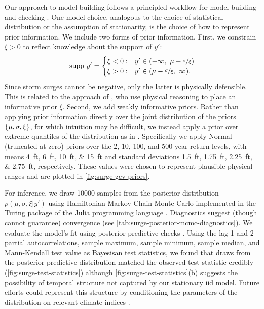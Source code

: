 \documentclass[11pt]{article}
\begin{document}
Our approach to model building follows a principled workflow for model building and checking \citep[see][for details]{gelman_workflow:2020}.
One model choice, analogous to the choice of statistical distribution or the assumption of stationarity, is the choice of how to represent prior information.
We include two forms of prior information.
First, we constrain $\xi > 0$ to reflect knowledge about the support of $y'$:
\begin{equation*}
    \mathrm{supp}~ y' =
    \begin{cases}
        \xi < 0: & y' \in \qty(-\infty,~ \mu - \nicefrac{\sigma}{\xi}) \\
        \xi > 0: & y' \in \qty(\mu-\nicefrac{\sigma}{\xi},~ \infty).
    \end{cases}
\end{equation*}
Since storm surges cannot be negative, only the latter is physically defensible.
This is related to the approach of \citet{martins_estimators:2000}, who use physical reasoning to place an informative prior $\xi$.
Second, we add weakly informative priors.
Rather than applying prior information directly over the joint distribution of the priors $\qty{\mu,\sigma,\xi}$, for which intuition may be difficult, we instead apply a prior over extreme quantiles of the distribution as in \citet{coles_evd:1996}.
Specifically we apply Normal (truncated at zero) priors over the 2, 10, 100, and 500 year return levels, with means \SIlist{4;6;10;15}{ft} and standard deviations \SIlist{1.5;1.75;2.25;2.75}{ft}, respectively.
These values were chosen to represent plausible physical ranges and are plotted in \cref{fig:surge-gev-priors}.

For inference, we draw \num{10000} samples from the posterior distribution $p(\mu,\sigma,\xi | y')$ using Hamiltonian Markov Chain Monte Carlo \citep{Betancourt:2017vd,hoffman_nuts:2011} implemented in the Turing package of the Julia programming language \citep{perkel_julia:2019,ge_turing:2018,tarek_dynamicppl:2020,besancon_distributions.jl:2021,bezanson_julia:2012}.
Diagnostics suggest (though cannot guarantee) convergence (see \cref{tab:surge-posterior-mcmc-diagnostics}).
We evaluate the model's fit using posterior predictive checks \citep[section 2.4 and references therein]{gelman_workflow:2020}.
Using the lag 1 and 2 partial autocorrelations, sample maximum, sample minimum, sample median, and Mann-Kendall test value as Bayesisan test statistics, we found that draws from the posterior predictive distribution matched the observed test statistic credibly (\cref{fig:surge-test-statistics}) although \cref{fig:surge-test-statistics}(b) suggests the possibility of temporal structure not captured by our stationary \gls{iid} model.
Future efforts could represent this structure by conditioning the parameters of the distribution on relevant climate indices \citep[as in][]{wong_structural:2020,Farnham:2016tw,farnham_jetstream:2017}.
\end{document}
